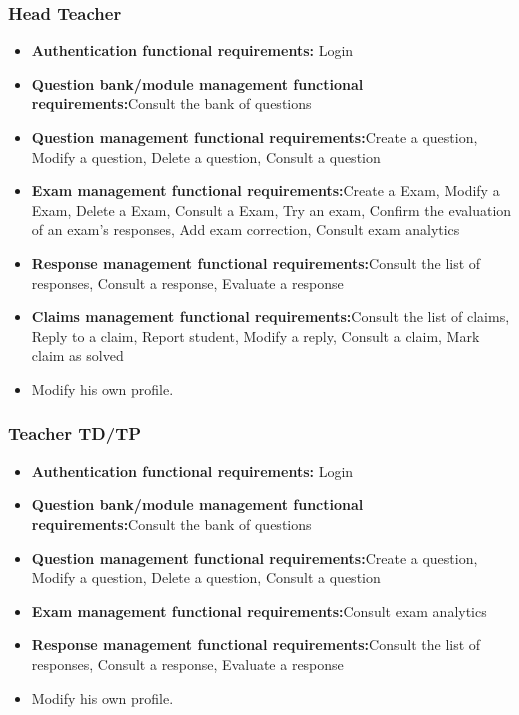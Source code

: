 \documentclass[]{uc2pfecaneva}
\begin{document}
    \subsubsection{Head Teacher}
    \begin{itemize}
        \item{\textbf{Authentication functional requirements:} Login}
        \item{\textbf{Question bank/module management functional requirements:}Consult the bank of questions}
        \item{\textbf{Question management functional requirements:}Create a question, Modify a question, Delete a question, Consult a question}
        \item{\textbf{Exam management functional requirements:}Create a Exam, Modify a Exam, Delete a Exam, Consult a Exam, Try an exam, Confirm the evaluation of an exam's responses, Add exam correction, Consult exam analytics}
        \item{\textbf{Response management functional requirements:}Consult the list of responses, Consult a response, Evaluate a response}
        \item{\textbf{Claims management functional requirements:}Consult the list of claims, Reply to a claim, Report student, Modify a reply, Consult a claim, Mark claim as solved}
        \item Modify his own profile.
    \end{itemize}


    \subsubsection{Teacher TD/TP}
    \begin{itemize}
        \item{\textbf{Authentication functional requirements:} Login}
        \item{\textbf{Question bank/module management functional requirements:}Consult the bank of questions}
        \item{\textbf{Question management functional requirements:}Create a question, Modify a question, Delete a question, Consult a question}
        \item{\textbf{Exam management functional requirements:}Consult exam analytics}
        \item{\textbf{Response management functional requirements:}Consult the list of responses, Consult a response, Evaluate a response}
        \item Modify his own profile.
    \end{itemize}
\end{document}
